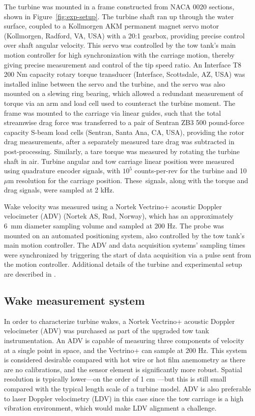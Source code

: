 The turbine was mounted in a frame constructed from NACA 0020 sections, shown in
Figure~\ref{fig:exp-setup}. The turbine shaft ran up through the water surface,
coupled to a Kollmorgen AKM permanent magnet servo motor (Kollmorgen, Radford,
VA, USA) with a 20:1 gearbox, providing precise control over shaft angular
velocity. This servo was controlled by the tow tank's main motion controller for
high synchronization with the carriage motion, thereby giving precise
measurement and control of the tip speed ratio. An Interface T8 200 Nm capacity
rotary torque transducer (Interface, Scottsdale, AZ, USA) was installed inline
between the servo and the turbine, and the servo was also mounted on a slewing
ring bearing, which allowed a redundant measurement of torque via an arm and
load cell used to counteract the turbine moment. The frame was mounted to the
carriage via linear guides, such that the total streamwise drag force was
transferred to a pair of Sentran ZB3 500 pound-force capacity S-beam load cells
(Sentran, Santa Ana, CA, USA), providing the rotor drag measurements, after a
separately measured tare drag was subtracted in post-processing. Similarly, a
tare torque was measured by rotating the turbine shaft in air. Turbine angular
and tow carriage linear position were measured using quadrature encoder signals,
with $10^5$ counts-per-rev for the turbine and 10 ${\mu}$m resolution for the
carriage position. These~signals, along with the torque and drag signals, were
sampled at 2 kHz.

Wake velocity was measured using a Nortek Vectrino+ acoustic Doppler velocimeter
(ADV) (Nortek AS, Rud, Norway), which has an approximately 6~mm diameter
sampling volume and sampled at 200 Hz. The probe was mounted on an automated
positioning system, also controlled by the tow tank's main motion controller.
The ADV and data acquisition systems' sampling times were synchronized by
triggering the start of data acquisition via a pulse sent from the motion
controller. Additional details of the turbine and experimental setup are
described in \cite{Bachant2015-JoT}.



\subsection{Wake measurement system}

In order to characterize turbine wakes, a Nortek Vectrino+ acoustic Doppler
velocimeter (ADV) was purchased as part of the upgraded tow tank
instrumentation. An ADV is capable of measuring three components of velocity at
a single point in space, and the Vectrino+ can sample at 200 Hz. This system is
considered desirable compared with hot wire or hot film anemometry as there are
no calibrations, and the sensor element is significantly more robust. Spatial
resolution is typically lower---on the order of 1 cm \cite{NortekVectrino}---but
this is still small compared with the typical length scale of a turbine model.
ADV is also preferable to laser Doppler velocimetry (LDV) in this case since the
tow carriage is a high vibration environment, which would make LDV alignment a
challenge.

